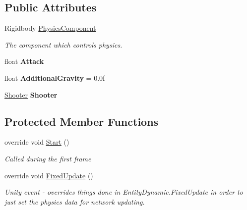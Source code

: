 \subsection*{Public Attributes}
\begin{DoxyCompactItemize}
\item 
Rigidbody \hyperlink{class_skyrates_1_1_entity_1_1_entity_projectile_a8882ddff06e010914232b464f916704a}{Physics\-Component}
\begin{DoxyCompactList}\small\item\em The component which controls physics. \end{DoxyCompactList}\item 
\hypertarget{class_skyrates_1_1_entity_1_1_entity_projectile_a1638947a56e89b987643b0a511ecf561}{float {\bfseries Attack}}\label{class_skyrates_1_1_entity_1_1_entity_projectile_a1638947a56e89b987643b0a511ecf561}

\item 
\hypertarget{class_skyrates_1_1_entity_1_1_entity_projectile_aff45a5d2a77d4c5101602a6379992c3e}{float {\bfseries Additional\-Gravity} = 0.\-0f}\label{class_skyrates_1_1_entity_1_1_entity_projectile_aff45a5d2a77d4c5101602a6379992c3e}

\item 
\hypertarget{class_skyrates_1_1_entity_1_1_entity_projectile_ae843aa3c9e8278052f514c76dbf77875}{\hyperlink{class_skyrates_1_1_mono_1_1_shooter}{Shooter} {\bfseries Shooter}}\label{class_skyrates_1_1_entity_1_1_entity_projectile_ae843aa3c9e8278052f514c76dbf77875}

\end{DoxyCompactItemize}
\subsection*{Protected Member Functions}
\begin{DoxyCompactItemize}
\item 
override void \hyperlink{class_skyrates_1_1_entity_1_1_entity_projectile_a0d55be517e4dd2a7a22fbef3681f2ec2}{Start} ()
\begin{DoxyCompactList}\small\item\em Called during the first frame \end{DoxyCompactList}\item 
override void \hyperlink{class_skyrates_1_1_entity_1_1_entity_projectile_a545a608eb8cf7e5c7ab0ce7659b8bc27}{Fixed\-Update} ()
\begin{DoxyCompactList}\small\item\em Unity event -\/ overrides things done in Entity\-Dynamic.\-Fixed\-Update in order to just set the physics data for network updating. \end{DoxyCompactList}\end{DoxyCompactItemize}
